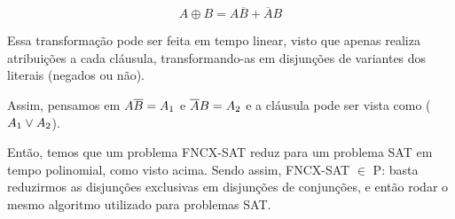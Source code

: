\documentclass[12pt]{article}
\begin{document}
\begin{enumerate}
{    $$ A \oplus B = A \overline{B} + \overline{A} B $$
    
    Essa transformação pode ser feita em tempo linear, visto que apenas realiza atribuições a cada cláusula, transformando-as em disjunções de variantes dos literais (negados ou não).
    
    Assim, pensamos em $A\overline{B} = A\textsubscript{1}$ e $\overline{A}B = A\textsubscript{2}$ e a cláusula pode ser vista como ($A\textsubscript{1} \lor A\textsubscript{2}$).
    
    Então, temos que um problema FNCX-SAT reduz para um problema SAT em tempo polinomial, como visto acima. Sendo assim, FNCX-SAT $\in$ P: basta reduzirmos as disjunções exclusivas em disjunções de conjunções, e então rodar o mesmo algoritmo utilizado para problemas SAT.
    
  }
\end{enumerate}
\end{document}
